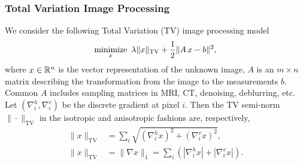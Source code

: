 \subsubsection{Total Variation Image Processing}
We consider the following Total Variation (TV) image processing model
\begin{equation}\label{eqn:tvl2}
\Min_{x}~\lambda \|x\|_{\text{TV}} + \frac{1}{2} \|A\,x - b\|^2,
\end{equation}
where $x\in \mathbb{R}^n$ is the vector representation of the unknown image, $A$ is an $m \times n$ matrix describing the transformation from the image to the measurements $b$. Common $A$ includes sampling matrices in MRI, CT, denoising, deblurring, etc.  Let $(\nabla_i^h,\nabla_i^v)$ be the discrete gradient at pixel $i$. Then the TV semi-norm $\|\cdot\|_{\text{TV}}$ in the isotropic and anisotropic fashions are, respectively,
\begin{subequations}
\begin{align}
\|x\|_{\text{TV}} &= {\sum_{i} \sqrt{(\nabla_i^h x)^2 + (\nabla_i^v x)^2},}\\
  \| x\|_{\text{TV}} &= \| \nabla x\|_1 = \sum_{i} \left(|\nabla_i^h x| + |\nabla_i^v x|\right).
	\end{align}
\end{subequations}

%
%
%

